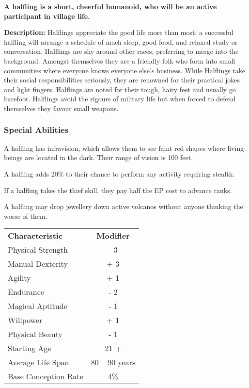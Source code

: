 \begin{multicols*}{3}
\textbf{A halfling is a short, cheerful humanoid, who will be an
active participant in village life.}

\textbf{Description:} Halflings appreciate the good life more than
most; a successful halfling will arrange a schedule of much sleep,
good food, and relaxed study or conversation. Halflings are shy around
other races, preferring to merge into the background.  Amongst
themselves they are a friendly folk who form into small communities
where everyone knows everyone else's business. While Halflings take
their social responsibilities seriously, they are renowned for their
practical jokes and light fingers. Halflings are noted for their
tough, hairy feet and usually go barefoot. Halflings avoid the rigours
of military life but when forced to defend themselves they favour
small weapons.

\subsubsection{Special Abilities}

\begin{Enumerate}
\item
A halfling has infravision, which allows them to see faint red shapes
where living beings are located in the dark. Their range of vision is
100 feet.

\item
A halfling adds 20\% to their chance to perform any activity requiring
stealth.

\item
If a halfling takes the thief skill, they pay half the EP cost to
advance ranks.

\item
A halfling may drop jewellery down active volcanos without anyone
thinking the worse of them.
\end{Enumerate}

\begin{tabularx}{\linewidth}{Xc}
\textbf{Characteristic} & \textbf{Modifier} \\
Physical Strength	& - 3 \\
Manual Dexterity	& + 3 \\
Agility			& + 1 \\
Endurance		& - 2 \\
Magical Aptitude	& - 1 \\
Willpower		& + 1 \\
Physical Beauty		& - 1 \\
Starting Age		& 21 + \\
Average Life Span 	& 80 -- 90 years \\
Base Conception Rate	& 4\% \\
\end{tabularx}


\end{multicols*}
